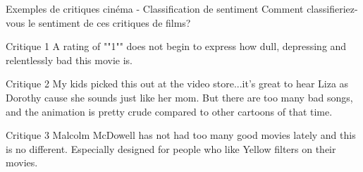 \documentclass[aspectratio=169,11pt]{beamer}
\begin{document}
\begin{frame}{Exemples de critiques cinéma - Classification de sentiment}
    Comment classifieriez-vous le sentiment de ces critiques de films?
    
    \begin{exampleblock}{Critique 1}
        \small{A rating of ""1"" does not begin to express how dull, depressing and relentlessly bad this movie is.}
    \end{exampleblock}
    
    \begin{exampleblock}{Critique 2}
        \small{My kids picked this out at the video store...it's great to hear Liza as Dorothy cause she sounds just like her mom. But there are too many bad songs, and the animation is pretty crude compared to other cartoons of that time.}
    \end{exampleblock}
    
    \begin{exampleblock}{Critique 3}
        \small{Malcolm McDowell has not had too many good movies lately and this is no different. Especially designed for people who like Yellow filters on their movies.}
    \end{exampleblock}
    
    \vspace{0.3cm}
    \centering
\end{frame}
\end{document}
